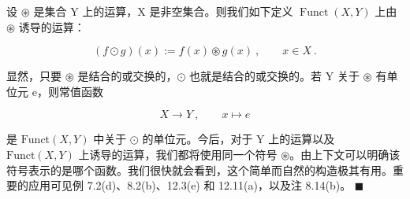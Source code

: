 \begin{example}

设  $ \circledast $ 是集合 Y 上的运算，X 是非空集合。则我们如下定义  $ \operatorname{Funct}(X,Y) $ 上由  $ \circledast $ 诱导的运算：

\[
(f\odot g)(x):=f(x)\circledast g(x)~,\qquad x\in X~.
\]

显然，只要  $ \circledast $ 是结合的或交换的，$ \odot $ 也就是结合的或交换的。若 Y 关于  $ \circledast $ 有单位元 e，则常值函数

\[
X\to Y~,\qquad x\mapsto e
\]

是  $ \text{Funct}(X, Y) $ 中关于  $ \odot $ 的单位元。今后，对于 Y 上的运算以及  $ \text{Funct}(X, Y) $ 上诱导的运算，我们都将使用同一个符号  $ \circledast $。由上下文可以明确该符号表示的是哪个函数。我们很快就会看到，这个简单而自然的构造极其有用。重要的应用可见例 7.2(d)、8.2(b)、12.3(e) 和 12.11(a)，以及注 8.14(b)。 $ \blacksquare $

\end{example}

\exerciseshead

